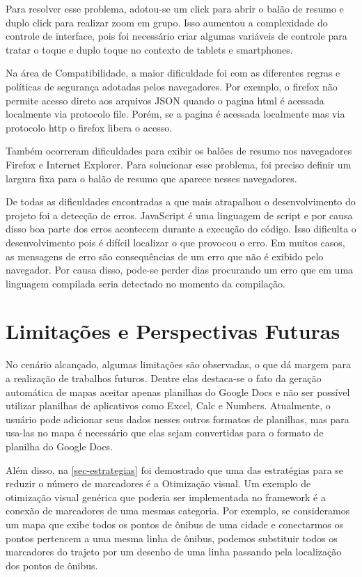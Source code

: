 Para resolver esse problema, adotou-se um click para abrir o balão de resumo e duplo click para realizar zoom em grupo. Isso aumentou a complexidade do controle de interface, pois foi necessário criar algumas variáveis de controle para tratar o toque e duplo toque no contexto de tablets e smartphones.

Na área de Compatibilidade, a maior dificuldade foi com as diferentes regras e políticas de segurança adotadas pelos navegadores. Por exemplo, o firefox não permite acesso direto aos arquivos JSON quando o pagina html é acessada localmente via protocolo file. Porém, se a pagina é acessada localmente mas via protocolo http o firefox libera o acesso. 

Também ocorreram dificuldades para exibir os balões de resumo nos navegadores Firefox e Internet Explorer. Para solucionar esse problema, foi preciso definir um largura fixa para o balão de resumo que aparece nesses navegadores.
 
De todas as dificuldades encontradas a que mais atrapalhou o desenvolvimento do projeto foi a detecção de erros. JavaScript é uma linguagem de script  e por causa disso boa parte dos erros acontecem durante a execução do código. Isso dificulta o desenvolvimento pois é difícil localizar o que provocou o erro. Em muitos casos, as mensagens de erro são consequências de um erro que não é exibido pelo navegador. Por causa disso, pode-se perder dias procurando um erro que em uma linguagem compilada seria detectado no momento da compilação.


\section{Limitações e Perspectivas Futuras}


No cenário alcançado, algumas limitações são observadas, o que dá margem para a realização de trabalhos futuros. Dentre elas destaca-se o fato da geração automática de mapas aceitar apenas planilhas do Google Docs e não ser possível utilizar planilhas de aplicativos como Excel, Calc e Numbers. Atualmente, o usuário pode adicionar seus dados nesses outros formatos de planilhas, mas para usa-las no mapa  é necessário que elas sejam convertidas para  o formato de planilha do Google Docs.

Além disso, na \autoref{sec-estrategias} foi demostrado que uma das estratégias para se reduzir o número de marcadores é a Otimização visual. Um exemplo de otimização visual genérica que poderia ser implementada no framework é a conexão de marcadores de uma mesmas categoria. Por exemplo, se consideramos um mapa que exibe todos os pontos de ônibus de uma cidade e conectarmos os pontos pertencem a uma mesma linha de ônibus, podemos substituir todos os marcadores do trajeto por um desenho de uma linha passando pela localização dos pontos de ônibus. 

